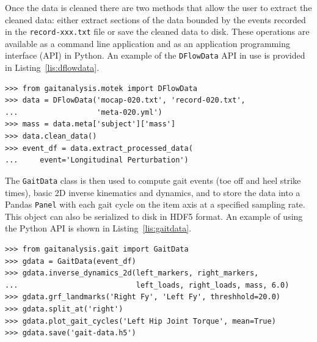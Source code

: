 \documentclass[fleqn,12pt]{wlpeerj}
\begin{document}
Once the data is cleaned there are two methods that allow the user to extract
the cleaned data: either extract sections of the data bounded by the events
recorded in the \verb|record-xxx.txt| file or save the cleaned data to disk.
These operations are available as a command line application and as an
application programming interface (API) in Python. An example of the
\verb|DFlowData| API in use is provided in Listing~\ref{lis:dflowdata}.
%
\begin{listing}
  \begin{verbatim}
>>> from gaitanalysis.motek import DFlowData
>>> data = DFlowData('mocap-020.txt', 'record-020.txt',
...                  'meta-020.yml')
>>> mass = data.meta['subject']['mass']
>>> data.clean_data()
>>> event_df = data.extract_processed_data(
...     event='Longitudinal Perturbation')
  \end{verbatim}
  \cprotect\caption{Python interpreter session showing how one could load a
    trial into memory, extract the subject's mass from the meta data, run the
    data cleaning process, and finally extract a Pandas \verb|DataFrame|
    containing all of the time histories for a specific event in the trial.}
  \label{lis:dflowdata}
\end{listing}

The \verb|GaitData| class is then used to compute gait events (toe off and heel
strike times), basic 2D inverse kinematics and dynamics, and to store the data
into a Pandas \verb|Panel| with each gait cycle on the item axis at a specified
sampling rate. This object can also be serialized to disk in HDF5 format. An
example of using the Python API is shown in Listing~\ref{lis:gaitdata}.
%
\begin{listing}
  \begin{verbatim}
>>> from gaitanalysis.gait import GaitData
>>> gdata = GaitData(event_df)
>>> gdata.inverse_dynamics_2d(left_markers, right_markers,
...                           left_loads, right_loads, mass, 6.0)
>>> gdata.grf_landmarks('Right Fy', 'Left Fy', threshhold=20.0)
>>> gdata.split_at('right')
>>> gdata.plot_gait_cycles('Left Hip Joint Torque', mean=True)
>>> gdata.save('gait-data.h5')
  \end{verbatim}
  \cprotect\caption{Python interpreter session showing how one could use the
    \verb|GaitData| class to load in the result of \verb|DFlowData| and compute
    the inverse dynamics (joint angles and torques), identify the gait events
    (e.g. heel strikes), split the data with respect to the gait events into a
    Pandas \verb|Panel|, plot the mean and standard deviation of one time
    history with respect to the gait cycles, and save the data to disk.}
  \label{lis:gaitdata}
\end{listing}
\end{document}
